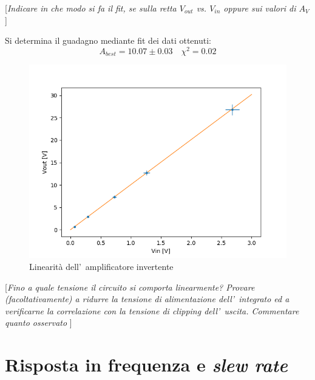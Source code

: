 \documentclass[10pt,a4paper]{article}
\newcommand{\rem}[1]{[\emph{#1}]}
\begin{document}
\rem{Indicare in che modo si fa il fit, se sulla retta $V_{out}$ vs. $V_{in}$ oppure sui valori di $A_V$   }

Si determina il guadagno mediante fit dei dati ottenuti:
\[
A_{best} = 10.07 \pm 0.03 \quad  \chi^2 = 0.02
\]
\begin{figure}[t]
\begin{center}
\includegraphics[width=0.8\linewidth]{1c.png}
\caption{\small Linearit\`a dell'~amplificatore invertente}
\label{fig:lin}
\end{center}
\end{figure}
%

\rem{Fino a quale tensione il circuito si comporta linearmente? Provare (facoltativamente) a ridurre la 
tensione di alimentazione dell'~integrato ed a verificarne la correlazione con la tensione di 
\emph{clipping} dell'~uscita. Commentare quanto osservato }

%
\section{Risposta in frequenza e \emph{slew rate}}
\end{document}
